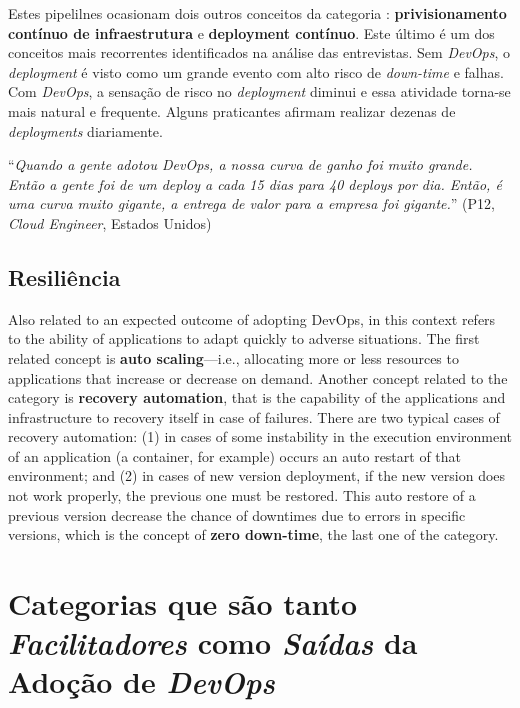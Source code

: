 Estes pipelilnes ocasionam dois outros conceitos da categoria :
{\bf privisionamento contínuo de infraestrutura} e {\bf deployment contínuo}.
Este último é um dos conceitos mais recorrentes identificados na análise das
entrevistas. Sem {\it DevOps}, o {\it deployment} é visto como um grande evento
com alto risco de {\it down-time} e falhas. Com {\it DevOps}, a sensação de
risco no {\it deployment} diminui e essa atividade torna-se mais natural e
frequente. Alguns praticantes afirmam realizar dezenas de {\it deployments}
diariamente.

\begin{mq}
``\emph{Quando a gente adotou DevOps, a nossa curva de ganho foi muito grande.
Então a gente foi de um deploy a cada 15 dias para 40 deploys por dia. Então,
é uma curva muito gigante, a entrega de valor para a empresa foi gigante.}''
(P12, {\it Cloud Engineer}, Estados Unidos)
\end{mq}

\subsection{Resiliência}

Also related to an expected outcome of adopting DevOps,  in this
context refers to the ability of applications to adapt quickly to adverse situations.
The first related concept is \textbf{auto scaling}---i.e.,
allocating more or less resources to applications that increase or
decrease on demand. Another concept related to
the  category is \textbf{recovery automation}, that is
the capability of the applications and infrastructure to recovery itself in case of
failures. There are two typical cases of recovery automation: (1) in cases
of some instability in the execution environment of an application (a
container, for example) occurs an auto restart of that environment; and (2) in
cases of new version deployment, if the new version does not work properly, the
previous one must be restored. This auto restore of a previous version
decrease the chance of downtimes due to errors in specific versions, which
is the concept of \textbf{zero down-time}, the last one of the  category.

\section{Categorias que são tanto \emph{Facilitadores} como \emph{Saídas} da Adoção de \emph{DevOps}}
\label{secao_facilitadores_e_saidas}


